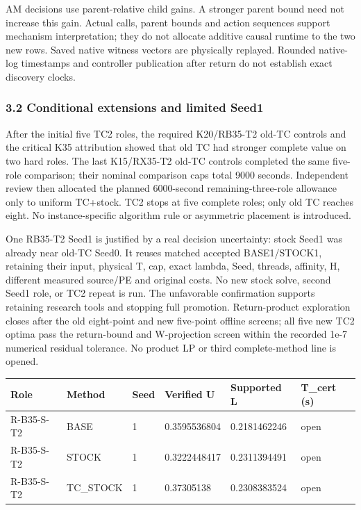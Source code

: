 \documentclass[
  american,
  11pt,
]{article}
\newcounter{none} %
\begin{document}
AM decisions use parent-relative child gains. A stronger parent bound
need not increase this gain. Actual calls, parent bounds and action
sequences support mechanism interpretation; they do not allocate
additive causal runtime to the two new rows. Saved native witness
vectors are physically replayed. Rounded native-log timestamps and
controller publication after return do not establish exact discovery
clocks.

\subsubsection{3.2 Conditional extensions and limited
Seed1}\label{conditional-extensions-and-limited-seed1}

After the initial five TC2 roles, the required K20/RB35-T2 old-TC
controls and the critical K35 attribution showed that old TC had
stronger complete value on two hard roles. The last K15/RX35-T2 old-TC
controls completed the same five-role comparison; their nominal
comparison caps total 9000 seconds. Independent review then allocated
the planned 6000-second remaining-three-role allowance only to uniform
TC+stock. TC2 stops at five complete roles; only old TC reaches eight.
No instance-specific algorithm rule or asymmetric placement is
introduced.

One RB35-T2 Seed1 is justified by a real decision uncertainty: stock
Seed1 was already near old-TC Seed0. It reuses matched accepted
BASE1/STOCK1, retaining their input, physical T, cap, exact lambda,
Seed, threads, affinity, H, different measured source/PE and original
costs. No new stock solve, second Seed1 role, or TC2 repeat is run. The
unfavorable confirmation supports retaining research tools and stopping
full promotion. Return-product exploration closes after the old
eight-point and new five-point offline screens; all five new TC2 optima
pass the return-bound and W-projection screen within the recorded 1e-7
numerical residual tolerance. No product LP or third complete-method
line is opened.


{\def\LTcaptype{none} %
\begin{longtable}[]{@{}llllll@{}}
\toprule\noalign{}
Role & Method & Seed & Verified U & Supported L & T\_\allowbreak{}cert (s) \\
\midrule\noalign{}
\endhead
\bottomrule\noalign{}
\endlastfoot
R-B35-S-T2 & BASE & 1 & 0.3595536804 & 0.2181462246 & open \\
R-B35-S-T2 & STOCK & 1 & 0.3222448417 & 0.2311394491 & open \\
R-B35-S-T2 & TC\_\allowbreak{}STOCK & 1 & 0.37305138 & 0.2308383524 & open \\
\end{longtable}
}
\end{document}
